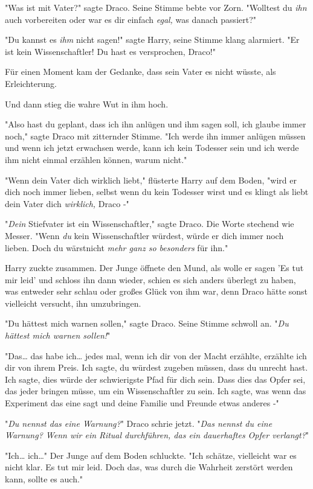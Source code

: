 {"Was ist mit Vater?" sagte Draco. Seine Stimme bebte vor Zorn. "Wolltest du \emph{ihn} auch vorbereiten oder war es dir einfach \emph{egal,} was danach passiert?"

"Du kannst es \emph{ihm} nicht sagen!" sagte Harry, seine Stimme klang alarmiert. "Er ist kein Wissenschaftler! Du hast es versprochen, Draco!"

Für einen Moment kam der Gedanke, dass sein Vater es nicht wüsste, als Erleichterung.

Und dann stieg die wahre Wut in ihm hoch.

"Also hast du geplant, dass ich ihn anlügen und ihm sagen soll, ich glaube immer noch," sagte Draco mit zitternder Stimme. "Ich werde ihn immer anlügen müssen und wenn ich jetzt erwachsen werde, kann ich kein Todesser sein und ich werde ihm nicht einmal erzählen können, warum nicht."

"Wenn dein Vater dich wirklich liebt," flüsterte Harry auf dem Boden, "wird er dich noch immer lieben, selbst wenn du kein Todesser wirst und es klingt als liebt dein Vater dich \emph{wirklich,} Draco -"

"\emph{Dein} Stiefvater ist ein Wissenschaftler," sagte Draco. Die Worte stechend wie Messer. "Wenn \emph{du} kein Wissenschaftler würdest, würde er dich immer noch lieben. Doch du wärstnicht \emph{mehr ganz so besonders} für ihn."

Harry zuckte zusammen. Der Junge öffnete den Mund, als wolle er sagen 'Es tut mir leid' und schloss ihn dann wieder, schien es sich anders überlegt zu haben, was entweder sehr schlau oder großes Glück von ihm war, denn Draco hätte sonst vielleicht versucht, ihn umzubringen.

"Du hättest mich warnen sollen," sagte Draco. Seine Stimme schwoll an. "\emph{Du hättest mich warnen sollen!}"

"Das… das habe ich… jedes mal, wenn ich dir von der Macht erzählte, erzählte ich dir von ihrem Preis. Ich sagte, du würdest zugeben müssen, dass du unrecht hast. Ich sagte, dies würde der schwierigste Pfad für dich sein. Dass dies das Opfer sei, das jeder bringen müsse, um ein Wissenschaftler zu sein. Ich sagte, was wenn das Experiment das eine sagt und deine Familie und Freunde etwas anderes -"

"\emph{Du nennst das eine Warnung?}" Draco schrie jetzt. "\emph{Das nennst du eine Warnung? Wenn wir ein Ritual durchführen, das ein dauerhaftes Opfer verlangt?}"

"Ich… ich…" Der Junge auf dem Boden schluckte. "Ich schätze, vielleicht war es nicht klar. Es tut mir leid. Doch das, was durch die Wahrheit zerstört werden kann, sollte es auch."

}
